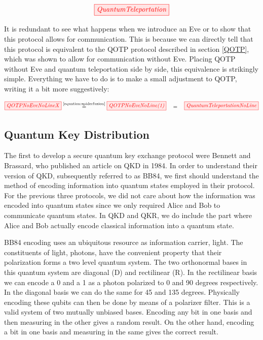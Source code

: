 \documentclass[]{article}
\newcommand{\equaltext}[1]{\ensuremath{\stackrel{\text{#1}}{=}}}
\begin{document}
\begin{equation}
	\label{equation:quantumteleportation}
	\tikzfig{QuantumTeleportation}
\end{equation}
 
It is redundant to see what happens when we introduce an Eve or to show that this protocol allows for communication. This is because we can directly tell that this protocol is equivalent to the QOTP protocol described in section \ref{QOTP}, which was shown to allow for communication without Eve. Placing QOTP without Eve and quantum teleportation side by side, this equivalence is strikingly simple. Everything we have to do is to make a small adjustment to QOTP, writing it a bit more suggestively:

\begin{equation}
\label{equation:QOTPQuantumTeleportationEquivalence}
\tikzfig{QOTPNoEveNoLineX} \equaltext{\ref{equation:spiderfusion}} \tikzfig{QOTPNoEveNoLine(1)}~~~ = ~~~\tikzfig{QuantumTeleportationNoLine}
\end{equation}
 
\subsection{Quantum Key Distribution}

\label{QuantumKeyDistribution}

The first to develop a secure quantum key exchange protocol were Bennett and Brassard, who published an article on QKD in 1984. In order to understand their version of QKD, subsequently referred to as BB84, we first should understand the method of encoding information into quantum states employed in their protocol. For the previous three protocols, we did not care about how the information was encoded into quantum states since we only required Alice and Bob to communicate quantum states. In QKD and QKR, we do include the part where Alice and Bob actually encode classical information into a quantum state.

BB84 encoding uses an ubiquitous resource as information carrier, light. The constituents of light, photons, have the convenient property that their polarization forms a two level quantum system. The two orthonormal bases in this quantum system are diagonal (D) and rectilinear (R). In the rectilinear basis we can encode a 0 and a 1 as a photon polarized to 0 and 90 degrees respectively. In the diagonal basis we can do the same for 45 and 135 degrees. Physically encoding these qubits can then be done by means of a polarizer filter. This is a valid system of two mutually unbiased bases. Encoding any bit in one basis and then measuring in the other gives a random result. On the other hand, encoding a bit in one basis and measuring in the same gives the correct result. 
\end{document}
